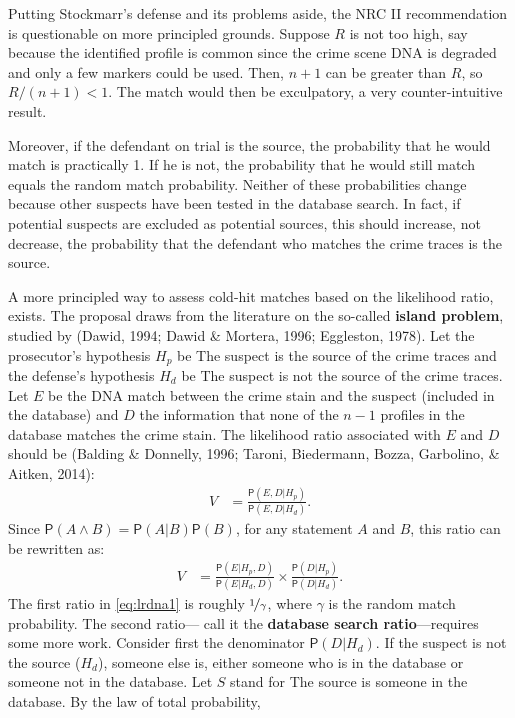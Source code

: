 \documentclass[10pt,dvipsnames,enabledeprecatedfontcommands]{scrartcl}
\newcommand{\pr}[1]{\mathsf{P}(#1)}
\begin{document}
Putting Stockmarr's defense and its problems aside, the NRC II
recommendation is questionable on more principled grounds. Suppose \(R\)
is not too high, say because the identified profile is common since the
crime scene DNA is degraded and only a few markers could be used. Then,
\(n+1\) can be greater than \(R\), so \(R/(n+1)<1\). The match would
then be exculpatory, a very counter-intuitive result.

Moreover, if the defendant on trial is the source, the probability that
he would match is practically 1. If he is not, the probability that he
would still match equals the random match probability. Neither of these
probabilities change because other suspects have been tested in the
database search. In fact, if potential suspects are excluded as
potential sources, this should increase, not decrease, the probability
that the defendant who matches the crime traces is the source.

A more principled way to assess cold-hit matches based on the likelihood
ratio, exists. The proposal draws from the literature on the so-called
\textbf{island problem}, studied by (Dawid, 1994; Dawid \& Mortera,
1996; Eggleston, 1978). Let the prosecutor's hypothesis \(H_p\) be
\textsf{The suspect is the source of the crime traces} and the defense's
hypothesis \(H_d\) be
\textsf{The suspect is not the source of the crime traces}. Let \(E\) be
the DNA match between the crime stain and the suspect (included in the
database) and \(D\) the information that none of the \(n-1\) profiles in
the database matches the crime stain. The likelihood ratio associated
with \(E\) and \(D\) should be (Balding \& Donnelly, 1996; Taroni,
Biedermann, Bozza, Garbolino, \& Aitken, 2014): \begin{align*}
V & = \frac{\pr{E,D\vert H_p}}{\pr{E,D\vert H_d}}.
\end{align*} Since \(\pr{A\wedge B}=\pr{A\vert B}\pr{B}\), for any
statement \(A\) and \(B\), this ratio can be rewritten as:
\begin{align}\label{eq:lrdna1}
V & = \frac{\pr{E\vert H_p,D}}{\pr{E\vert H_d,D}} \times \frac{\pr{D\vert H_p}}{\pr{D\vert H_d}}.
\end{align} \noindent The first ratio in \eqref{eq:lrdna1} is roughly
\(\nicefrac{1}{\gamma}\), where \(\gamma\) is the random match
probability. The second ratio--- call it the
\textbf{database search ratio}---requires some more work. Consider first
the denominator \(\pr{D \vert H_d}\). If the suspect is not the source
(\(H_d\)), someone else is, either someone who is in the database or
someone not in the database. Let \(S\) stand for
\textsf{The  source is someone in the database.} By the law of total
probability,
\end{document}
